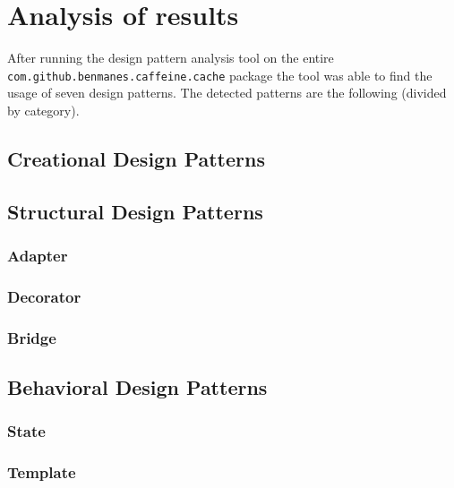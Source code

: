 \section{Analysis of results}

After running the design pattern analysis tool on the entire \texttt{com.github.benmanes.caffeine.cache} package the tool was able to find the usage of seven design patterns. The detected patterns are the following (divided by category).

\subsection{Creational Design Patterns}



\subsection{Structural Design Patterns}



\subsubsection{Adapter}

\subsubsection{Decorator}

\subsubsection{Bridge}

\subsection{Behavioral Design Patterns}

\subsubsection{State}

\subsubsection{Template}

